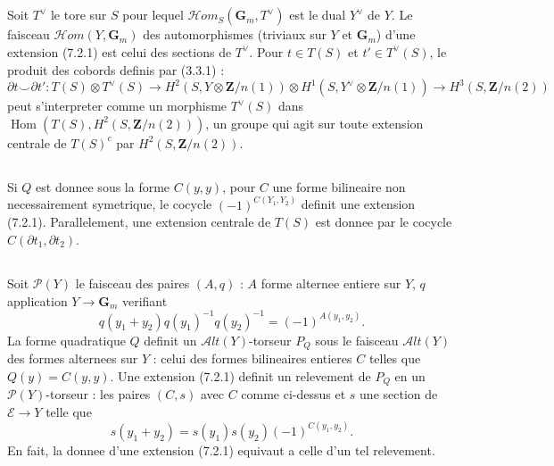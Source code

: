 \documentclass[11pt,a4paper]{article}
\theoremstyle{plain}
\theoremstyle{definition}
\DeclareMathOperator{\Hom}{Hom}
\begin{document}
\subsection{}\label{7.3}

Soit $T^\vee$ le tore sur $S$ pour lequel $\mathscr{H}om_S(\mathbf{G}_m, T^\vee)$ est le dual $Y^\vee$ de $Y$. Le faisceau $\mathscr{H}om(Y, \mathbf{G}_m)$ des automorphismes (triviaux sur $Y$ et $\mathbf{G}_m$) d'une extension (7.2.1) est celui des sections de $T^\vee$. Pour $t \in T(S)$ et $t' \in T^\vee(S)$, le produit des cobords definis par (3.3.1) :
\[
\partial t \smile \partial t' : T(S) \otimes T^\vee(S) \to H^2(S, Y \otimes \mathbf{Z}/n(1)) \otimes H^1(S, Y^\vee \otimes \mathbf{Z}/n(1)) \to H^3(S, \mathbf{Z}/n(2))
\]
peut s'interpreter comme un morphisme $T^\vee(S)$ dans $\Hom(T(S), H^2(S, \mathbf{Z}/n(2)))$, un groupe qui agit sur toute extension centrale de $T(S)^c$ par $H^2(S, \mathbf{Z}/n(2))$.

\subsection{}\label{7.4}

Si $Q$ est donnee sous la forme $C(y, y)$, pour $C$ une forme bilineaire non necessairement symetrique, le cocycle $(-1)^{C(Y_1, Y_2)}$ definit une extension (7.2.1). Parallelement, une extension centrale de $T(S)$ est donnee par le cocycle $C(\partial t_1, \partial t_2)$.

\subsection{}\label{7.5}

Soit $\mathscr{P}(Y)$ le faisceau des paires $(A, q)$ : $A$ forme alternee entiere sur $Y$, $q$ application $Y \to \mathbf{G}_m$ verifiant
\[
q(y_1 + y_2) q(y_1)^{-1} q(y_2)^{-1} = (-1)^{A(y_1, y_2)}.
\]
La forme quadratique $Q$ definit un $\mathscr{A}lt(Y)$-torseur $P_Q$ sous le faisceau $\mathscr{A}lt(Y)$ des formes alternees sur $Y$ : celui des formes bilineaires entieres $C$ telles que $Q(y) = C(y, y)$. Une extension (7.2.1) definit un relevement de $P_Q$ en un $\mathscr{P}(Y)$-torseur : les paires $(C, s)$ avec $C$ comme ci-dessus et $s$ une section de $\mathscr{E} \to Y$ telle que
\[
s(y_1 + y_2) = s(y_1) s(y_2) (-1)^{C(y_1, y_2)}.
\]
En fait, la donnee d'une extension (7.2.1) equivaut a celle d'un tel relevement.
\end{document}
